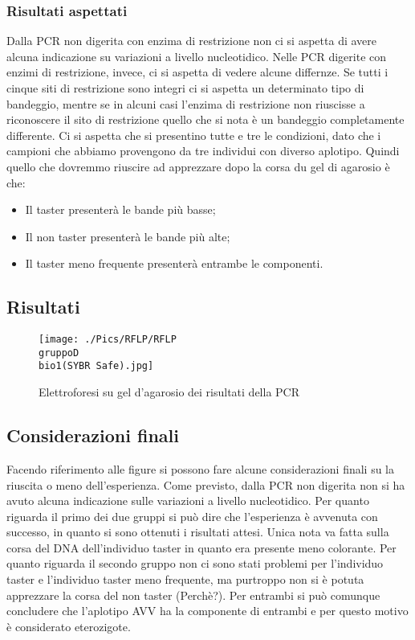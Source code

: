 	    \subsubsection*{Risultati aspettati}
    
        Dalla PCR non digerita con enzima di restrizione non ci si aspetta di avere alcuna indicazione su variazioni a livello nucleotidico. 
        Nelle PCR digerite con enzimi di restrizione, invece, ci si aspetta di vedere alcune differnze. Se tutti i cinque siti di restrizione sono integri ci si aspetta un determinato tipo di bandeggio, mentre se in alcuni casi l'enzima di restrizione non riuscisse a riconoscere il sito di restrizione quello che si nota è un bandeggio completamente differente. 
        Ci si aspetta che si presentino tutte e tre le condizioni, dato che i campioni che abbiamo provengono da tre individui con diverso aplotipo. Quindi quello che dovremmo riuscire ad apprezzare dopo la corsa du gel di agarosio è che:
        \begin{itemize}
            \item Il taster presenterà le bande più basse; 
            \item Il non taster presenterà le bande più alte;
            \item Il taster meno frequente presenterà entrambe le componenti. 
        \end{itemize}
	
	\subsection*{Risultati}
		\begin{figure}[H]
			\centering
			\texttt{[image: ./Pics/RFLP/RFLP\\ gruppoD\\ bio1(SYBR Safe).jpg]}
			\caption{Elettroforesi su gel d'agarosio dei risultati della PCR}
			\label{fig1}
		\end{figure}

	\subsection*{Considerazioni finali}
	
	Facendo riferimento alle figure si possono fare alcune considerazioni finali su la riuscita o meno dell'esperienza. 
	Come previsto, dalla PCR non digerita non si ha avuto alcuna indicazione sulle variazioni a livello nucleotidico.
	Per quanto riguarda il primo dei due gruppi si può dire che l'esperienza è avvenuta con successo, in quanto si sono ottenuti i risultati attesi. Unica nota va fatta sulla corsa del DNA dell'individuo taster in quanto era presente meno colorante. 
	Per quanto riguarda il secondo gruppo non ci sono stati problemi per l'individuo taster e l'individuo taster meno frequente, ma purtroppo non si è potuta apprezzare la corsa del non taster (Perchè?). 
	Per entrambi si può comunque concludere che l'aplotipo AVV ha la componente di entrambi e per questo motivo è considerato eterozigote. 
